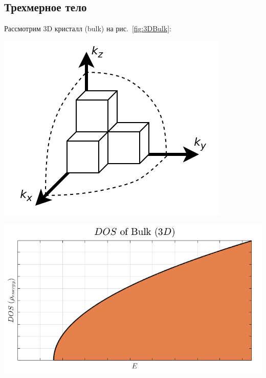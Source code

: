 
\subsection{Трехмерное тело}
Рассмотрим 3D кристалл (bulk) на рис.~\ref{fig:3DBulk}:\\

\noindent
\begin{minipage}[b]{0.4\textwidth}
	\centering
    \includegraphics[width=\textwidth]{assets/3DBulk}
\end{minipage}
\hfill
\begin{minipage}[b]{0.55\textwidth}
	\centering
	\includegraphics[width=\textwidth]{assets/gE3D}
\end{minipage}


